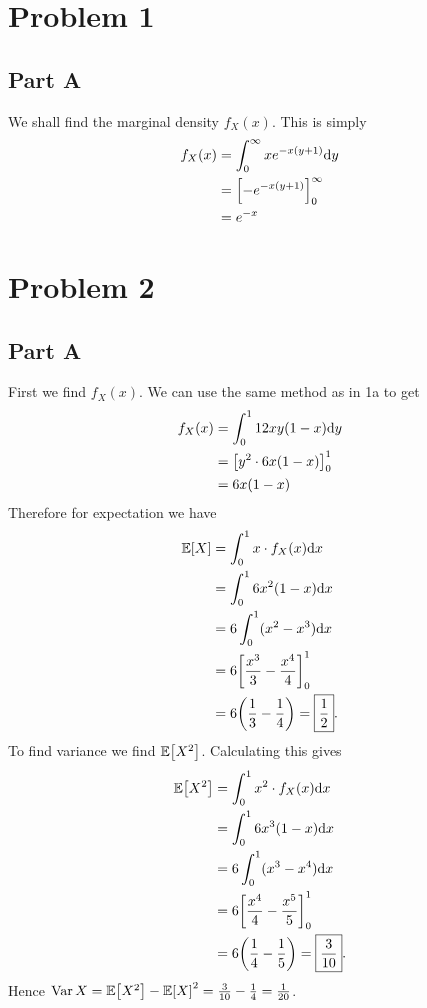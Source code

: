 \documentclass{eeleyes}
\begin{document}
\section*{Problem 1}
\subsection*{Part A}
We shall find the marginal density $f_X(x)$. This is simply
\begin{align*}
    f_X(x) &= \int_{0}^{\infty} x e^{-x(y+1)} \dd y \\
           &= \qty[ -e^{-x(y+1)} ]_0^\infty \\
           &= e^{-x}
\end{align*}

\section*{Problem 2}
\subsection*{Part A}
First we find $f_X(x)$. We can use the same method as in 1a to get
\begin{align*}
    f_X(x) &= \int_0^1 12xy(1-x) \dd y \\
           &= \qty[y^2 \cdot 6x(1-x)]_0^1 \\
           &= 6x(1-x)
\end{align*}
Therefore for expectation we have
\begin{align*}
    \mathbb{E}\qty[X] &= \int_0^1 x \cdot f_X(x) \dd x \\
    &= \int_0^1 6x^2 (1-x) \dd x \\
    &= 6\int_0^1 (x^2 - x^3) \dd x \\
    &= 6 \qty[\frac{x^3}{3} - \frac{x^4}{4}]_0^1 \\
    &= 6 \qty(\frac{1}{3} - \frac{1}{4}) = \boxed{\frac{1}{2}}.
\end{align*}
To find variance we find $\mathbb{E}\qty[X^2]$. Calculating this gives
\begin{align*}
    \mathbb{E}\qty[X^2] &= \int_0^1 x^2 \cdot f_X(x) \dd x \\
    &= \int_0^1 6x^3 (1-x) \dd x \\
    &= 6\int_0^1 (x^3 - x^4) \dd x \\
    &= 6 \qty[\frac{x^4}{4} - \frac{x^5}{5}]_0^1 \\
    &= 6 \qty(\frac{1}{4} - \frac{1}{5}) = \boxed{\frac{3}{10}}.
\end{align*}
Hence $\operatorname{Var}{X} = \mathbb{E}\qty[X^2] - \mathbb{E}\qty[X]^2 = \frac{3}{10} - \frac{1}{4} = \frac{1}{20}$.
\end{document}

